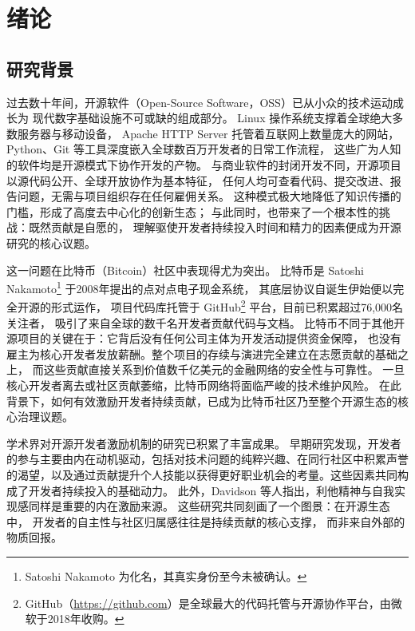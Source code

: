 \documentclass[
    type = master, %
    degree = professional,        %
    decl-page,  %
    twoside,                %
    fontset = fandol %
  ]{njuthesis}
\begin{document}
\mainmatter

\chapter{绪论}

\section{研究背景}

过去数十年间，开源软件（Open-Source Software，OSS）已从小众的技术运动成长为
现代数字基础设施不可或缺的组成部分\cite{lerner2002simple,chen2021opensource}。
Linux 操作系统支撑着全球绝大多数服务器与移动设备，
Apache HTTP Server 托管着互联网上数量庞大的网站，
Python、Git 等工具深度嵌入全球数百万开发者的日常工作流程，
这些广为人知的软件均是开源模式下协作开发的产物\cite{lakhani2003open}。
与商业软件的封闭开发不同，开源项目以源代码公开、全球开放协作为基本特征，
任何人均可查看代码、提交改进、报告问题，无需与项目组织存在任何雇佣关系。
这种模式极大地降低了知识传播的门槛，形成了高度去中心化的创新生态；
与此同时，也带来了一个根本性的挑战：既然贡献是自愿的，
理解驱使开发者持续投入时间和精力的因素便成为开源研究的核心议题。

这一问题在比特币（Bitcoin）社区中表现得尤为突出。
比特币是 Satoshi Nakamoto\footnote{Satoshi Nakamoto 为化名，其真实身份至今未被确认。} 于2008年提出的点对点电子现金系统\cite{nakamoto2008bitcoin,cheng2024bitcoin}，
其底层协议自诞生伊始便以完全开源的形式运作，
项目代码库托管于 GitHub\footnote{GitHub（\url{https://github.com}）是全球最大的代码托管与开源协作平台，由微软于2018年收购。} 平台，目前已积累超过76,000名关注者，
吸引了来自全球的数千名开发者贡献代码与文档。
比特币不同于其他开源项目的关键在于：它背后没有任何公司主体为开发活动提供资金保障，
也没有雇主为核心开发者发放薪酬。整个项目的存续与演进完全建立在志愿贡献的基础之上，
而这些贡献直接关系到价值数千亿美元的金融网络的安全性与可靠性。
一旦核心开发者离去或社区贡献萎缩，比特币网络将面临严峻的技术维护风险。
在此背景下，如何有效激励开发者持续贡献，已成为比特币社区乃至整个开源生态的核心治理议题。

学术界对开源开发者激励机制的研究已积累了丰富成果。
早期研究发现，开发者的参与主要由内在动机驱动，包括对技术问题的纯粹兴趣\cite{shah2006motivation}、在同行社区中积累声誉的渴望\cite{lerner2002simple}，以及通过贡献提升个人技能以获得更好职业机会的考量\cite{fang2009understanding}。这些因素共同构成了开发者持续投入的基础动力\cite{nov2007motivates}。
此外，Davidson 等人\cite{davidson2014older}指出，利他精神与自我实现感同样是重要的内在激励来源。
这些研究共同刻画了一个图景：在开源生态中，
开发者的自主性与社区归属感往往是持续贡献的核心支撑\cite{wang2023config}，
而非来自外部的物质回报。
\end{document}
